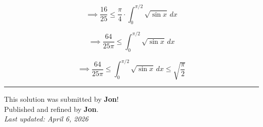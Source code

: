 \documentclass[12pt]{article}
\begin{document}
	$$\implies \frac{16}{25} \le \frac{\pi}{4} \cdot \int_0^{\pi/2} \sqrt{\sin x}\,dx$$

	$$\implies \frac{64}{25\pi} \le \int_0^{\pi/2} \sqrt{\sin x}\,dx$$

	$$\implies \frac{64}{25\pi} \le \int_0^{\pi/2} \sqrt{\sin x}\,dx \le \sqrt{\frac{\pi}{2}}$$


	\hrule

	\begin{center}
		This solution was submitted by \textbf{Jon}!\\[4pt]
		Published and refined by \textbf{Jon}.\\[8pt]
		\textit{Last updated: April 6, 2026}
	\end{center}
	
\end{document}

